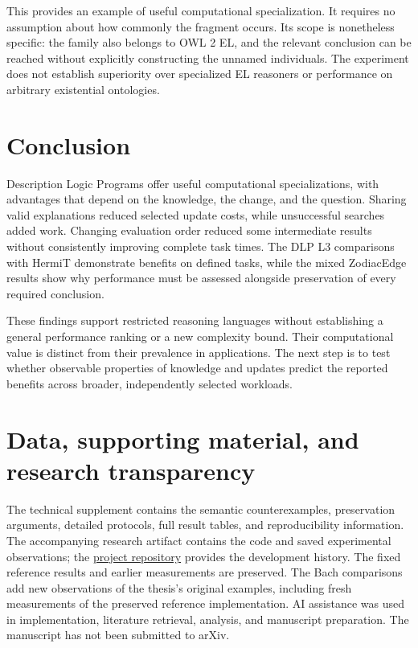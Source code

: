 \documentclass{article}
\begin{document}
This provides an example of useful computational specialization. It requires
no assumption about how commonly the fragment occurs. Its scope is nonetheless
specific: the family also belongs to OWL 2 EL, and the relevant conclusion can
be reached without explicitly constructing the unnamed individuals. The
experiment does not establish superiority over specialized EL reasoners or
performance on arbitrary existential ontologies.



\section{Conclusion}
Description Logic Programs offer useful computational specializations, with
advantages that depend on the knowledge, the change, and the question.
Sharing valid explanations reduced selected update costs, while unsuccessful
searches added work. Changing evaluation order reduced some intermediate
results without consistently improving complete task times. The DLP L3
comparisons with HermiT demonstrate benefits on defined tasks, while the
mixed ZodiacEdge results show why performance must be assessed alongside
preservation of every required conclusion.

These findings support restricted reasoning languages without establishing
a general performance ranking or a new complexity bound. Their computational
value is distinct from their prevalence in applications. The next step is to
test whether observable properties of knowledge and updates predict the
reported benefits across broader, independently selected workloads.

\section*{Data, supporting material, and research transparency}
The technical supplement contains the semantic counterexamples, preservation
arguments, detailed protocols, full result tables, and reproducibility
information. The accompanying research artifact contains the code and saved
experimental observations; the
\href{https://github.com/volzinnovation/my-phd-thesis-gpt-6-astra}{project repository}
provides the development history.
The fixed reference results and earlier measurements are preserved.
The Bach comparisons add new observations of the thesis's original examples,
including fresh measurements of the preserved reference implementation.
AI assistance was used in implementation, literature retrieval, analysis, and
manuscript preparation. The manuscript has not been submitted to arXiv.

\setlength{\bibsep}{3pt}
\renewcommand{\bibfont}{\small\raggedright}


\end{document}
